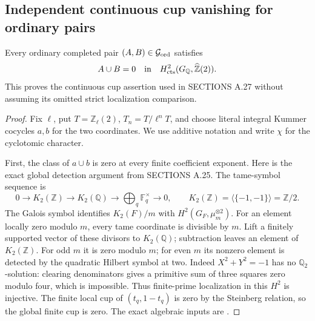\subsection{Independent continuous cup vanishing for ordinary pairs}
\label{sec:ghost-ordinary-cup}

\begin{proposition}
\label{prop:ghost-ordinary-cup}
Every ordinary completed pair \((A,B)\in\mathcal G_{\rm ord}\)
satisfies
\[
           A\cup B=0\quad\hbox{in}\quad
 H^2_{\rm cts}(G_{\mathbb Q},\widehat{\mathbb Z}(2)).
\]
This proves the continuous cup assertion used in SECTIONS A.27
without assuming its omitted strict localization comparison.
\end{proposition}
\begin{proof}
Fix \(\ell\), put \(T=\mathbb Z_\ell(2)\),
\(T_n=T/\ell^nT\), and choose literal integral Kummer
cocycles \(a,b\) for the two coordinates. We use additive
notation and write \(\chi\) for the cyclotomic character.

First, the class of \(a\cup b\) is zero at every finite
coefficient exponent. Here is the exact global detection
argument from SECTIONS A.25. The tame-symbol sequence is
\[
 0\longrightarrow K_2(\mathbb Z)\longrightarrow K_2(\mathbb Q)
 \longrightarrow\bigoplus_q\mathbb F_q^\times\longrightarrow0,
 \qquad K_2(\mathbb Z)=\langle\{-1,-1\}\rangle=\mathbb Z/2.
\]
The Galois symbol identifies \(K_2(F)/m\) with
\(H^2(G_F,\mu_m^{\otimes2})\). For an element locally
zero modulo \(m\), every tame coordinate is divisible by
\(m\). Lift a finitely supported vector of these divisors
to \(K_2(\mathbb Q)\); subtraction leaves an element of
\(K_2(\mathbb Z)\). For odd \(m\) it is zero modulo
\(m\); for even \(m\) its nonzero element is detected by
the quadratic Hilbert symbol at two. Indeed
\(X^2+Y^2=-1\) has no \(\mathbb Q_2\)-solution: clearing
denominators gives a primitive sum of three squares zero
modulo four, which is impossible. Thus finite-prime
localization in this \(H^2\) is injective. The finite local
cup of \((t_q,1-t_q)\) is zero by the Steinberg relation,
so the global finite cup is zero. The exact algebraic inputs
are \cite[III.5.2.2, III.6.5--6.5.1, III.6.10.3--6.10.4]{GhostWeibelKbook}.


\end{proof}
